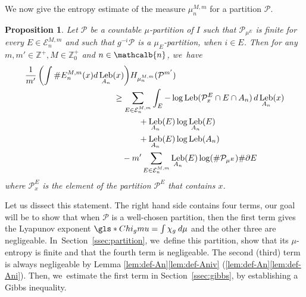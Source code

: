 \documentclass[JEP,XML,SOM,Unicode,NoFloatCountersInSection,published]{cedram}
\DeclareMathOperator{\Leb}{Leb}
\newcommand{\mcbn}{{\mathcalb{n}}}
\newtheorem{prop}[thm]{Proposition}
\theoremstyle{definition}
\newcommand{\bbZ}{{\mathbb{Z}}}
\begin{document}
We now give the entropy estimate of the measure $\mu_n^{M,m}$ for a partition $\mathcal{P}$.

\begin{prop}
\label{prop:entrop-estim}
Let $\mathcal{P}$ be a countable $\mu$-partition of $I$ such that $\mathcal{P}_{\mu^E}$ is finite for every $E \in \mathcal{E}_n^{M,m}$ and such that $g^{-i} \mathcal{P}$ is a $\mu_E$-partition, when $i \in E$.
Then for any $m,m' \in \bbZ^+, M \in \bbZ_0^+$ and $n \in \mcbn$, we~have
\begin{align*}
\frac{1}{m'} \left (\int \# E_n^{M,m}(x) d \Leb_{A_n}(x) \right) &H_{\mu_n^{M,m}}(\mathcal{P}^{m'})\\
&\hspace{-2em}\geq \sum_{E \in \mathcal{E}_n^{M,m}} \int_E - \log \Leb(\mathcal{P}_{x}^E \cap E \cap A_n) \,d \Leb_{A_n}(x)\\
&\hspace{1em}+ \Leb_{A_n}(E) \log \Leb_{A_n}(E)\\
&\hspace{1em}+ \Leb_{A_n}(E) \log \Leb(A_n)\\
&\hspace{-1em}- m' \sum_{E \in \mathcal{E}_n^{M,m}} \Leb_{A_n}(E) \log (\# \mathcal{P}_{\mu^E}) \# \partial E
\end{align*}
where $\mathcal{P}_x^E$ is the element of the partition $\mathcal{P}^E$ that contains $x$.
\end{prop}

Let us dissect this statement. The right hand side contains four terms, our goal will be to show that when $\mathcal{P}$ is a well-chosen partition, then the first term gives the Lyapunov exponent
$\gls*{Chi_gmu} = \int \chi_g \: d \mu$ and the other three are negligeable. In~Section~\ref{ssec:partition}, we~define this partition, show that its $\mu$-entropy is finite and that the fourth term is negligeable.
The second (\resp third) term is always negligeable by Lemma \ref{lem:def-An}\eqref{lem:def-Aniv} (\resp \ref{lem:def-An}\eqref{lem:def-Ani}).
Then, we~estimate the first term in Section~\ref{ssec:gibbs}, by establishing a Gibbs inequality.
\end{document}
